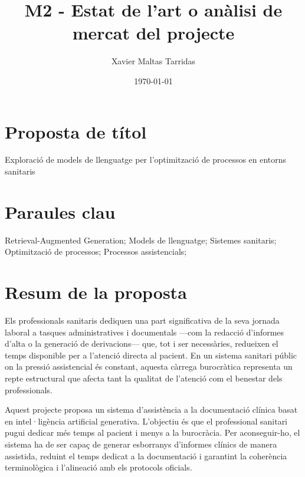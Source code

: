 \documentclass[11pt,a4paper]{article}
\title{ M2 - Estat de l'art o anàlisi de mercat del projecte }
\author{Xavier Maltas Tarridas}
\date{\today}
\begin{document}
\maketitle

\newpage
\tableofcontents
\newpage




\section*{Proposta de títol}
Exploració de models de llenguatge per l'optimització de 
processos en entorns sanitaris

\section*{Paraules clau}
Retrieval-Augmented Generation; Models de llenguatge; Sistemes sanitaris; Optimització de processos; Processos assistencials;


\section*{Resum de la proposta}

Els professionals sanitaris dediquen una part significativa de la seva jornada laboral a tasques administratives i documentals —com la redacció d'informes d'alta o la generació de derivacions— que, tot i ser necessàries, redueixen el temps disponible per a l'atenció directa al pacient. En un sistema sanitari públic on la pressió assistencial és constant, aquesta càrrega burocràtica representa un repte estructural que afecta tant la qualitat de l'atenció com el benestar dels professionals.

Aquest projecte proposa un sistema d'assistència a la documentació clínica basat en intel·ligència artificial generativa. L'objectiu és que el professional sanitari pugui dedicar més temps al pacient i menys a la burocràcia. Per aconseguir-ho, el sistema ha de ser capaç de generar esborranys d'informes clínics de manera assistida,  reduint el temps dedicat a la documentació i garantint la coherència terminològica i l’alineació amb els protocols oficials.
\end{document}

